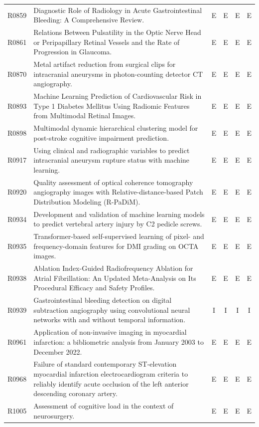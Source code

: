 \begin{longtable}{@{}l p{8.6cm} c c c c@{}}
R0859 & Diagnostic Role of Radiology in Acute Gastrointestinal Bleeding: A Comprehensive Review. & E & E & E & E \\
R0861 & Relations Between Pulsatility in the Optic Nerve Head or Peripapillary Retinal Vessels and the Rate of Progression in Glaucoma. & E & E & E & E \\
R0870 & Metal artifact reduction from surgical clips for intracranial aneurysms in photon-counting detector CT angiography. & E & E & E & E \\
R0893 & Machine Learning Prediction of Cardiovascular Risk in Type 1 Diabetes Mellitus Using Radiomic Features from Multimodal Retinal Images. & E & E & E & E \\
R0898 & Multimodal dynamic hierarchical clustering model for post-stroke cognitive impairment prediction. & E & E & E & E \\
R0917 & Using clinical and radiographic variables to predict intracranial aneurysm rupture status with machine learning. & E & E & E & E \\
R0920 & Quality assessment of optical coherence tomography angiography images with Relative-distance-based Patch Distribution Modeling (R-PaDiM). & E & E & E & E \\
R0934 & Development and validation of machine learning models to predict vertebral artery injury by C2 pedicle screws. & E & E & E & E \\
R0935 & Transformer-based self-supervised learning of pixel- and frequency-domain features for DMI grading on OCTA images. & E & E & E & E \\
R0938 & Ablation Index-Guided Radiofrequency Ablation for Atrial Fibrillation: An Updated Meta-Analysis on Its Procedural Efficacy and Safety Profiles. & E & E & E & E \\
R0939 & Gastrointestinal bleeding detection on digital subtraction angiography using convolutional neural networks with and without temporal information. & I & I & I & I \\
R0961 & Application of non-invasive imaging in myocardial infarction: a bibliometric analysis from January 2003 to December 2022. & E & E & E & E \\
R0968 & Failure of standard contemporary ST-elevation myocardial infarction electrocardiogram criteria to reliably identify acute occlusion of the left anterior descending coronary artery. & E & E & E & E \\
R1005 & Assessment of cognitive load in the context of neurosurgery. & E & E & E & E \\

\end{longtable}

